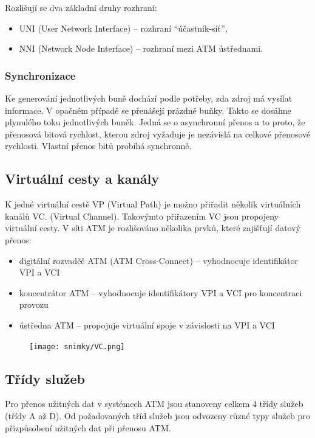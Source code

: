 Rozlišují se dva základní druhy rozhraní:
\begin{itemize}
    \item UNI (User Network Interface) -- rozhraní \enquote{účastník-síť},
    \item NNI (Network Node Interface) -- rozhraní mezi ATM ústřednami.
\end{itemize}

\subsubsection{Synchronizace}
Ke generování jednotlivých buně dochází podle potřeby, zda zdroj má vysílat informace. V opačném případě se přenášejí prázdné buňky. Takto se dosáhne
plynulého toku jednotlivých buněk. Jedná se o asynchronní přenos a to proto, že přenosová bitová rychlost, kterou zdroj vyžaduje je nezávislá na celkové přenosové rychlosti.  Vlastní přenos bitů probíhá synchronně.

\subsection{Virtuální cesty a kanály}
K jedné virtuální cestě VP (Virtual Path) je možno přiřadit několik virtuálních kanálů VC. (Virtual Channel). Takovýmto přiřazením VC jsou propojeny virtuální cesty. V síti ATM je rozlišováno několika prvků, které zajišťují datový přenos:

\begin{itemize}
    \item digitální rozvaděč ATM (ATM Cross-Connect) -- vyhodnocuje identifikátor VPI a VCI
    \item koncentrátor ATM -- vyhodnocuje identifikátory VPI a VCI pro koncentraci provozu
    \item ústředna ATM -- propojuje virtuální spoje v závislosti na VPI a VCI
\end{itemize}

\begin{figure} [h]
    \centering
    \texttt{[image: snimky/VC.png]}
    \label{fig:virt-cesty-kanaly}
\end{figure}

\subsection{Třídy služeb}
Pro přenos užitných dat v systémech ATM jsou stanoveny celkem 4 třídy služeb (třídy A až D). Od požadovaných tříd služeb jsou odvozeny různé typy služeb pro přizpůsobení užitných dat při přenosu ATM.

